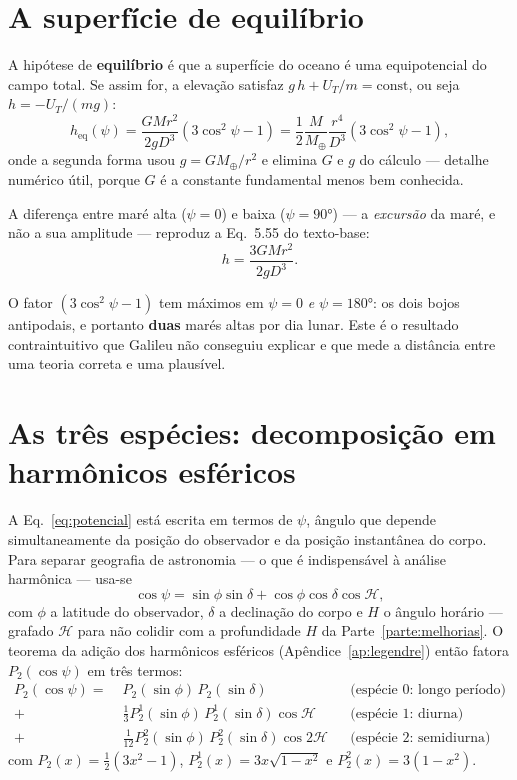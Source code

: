 \documentclass[11pt,a4paper,oneside]{report}
\theoremstyle{definition}
\theoremstyle{plain}
\theoremstyle{remark}
\begin{document}
\section{A superfície de equilíbrio}

A hipótese de \textbf{equilíbrio} é que a superfície do oceano é uma
equipotencial do campo total. Se assim for, a elevação satisfaz
$g\,h+U_T/m=\text{const}$, ou seja $h=-U_T/(mg)$:
\begin{equation}
h_{\text{eq}}(\psi)=\frac{GMr^{2}}{2gD^{3}}\left(3\cos^{2}\psi-1\right)
=\frac{1}{2}\frac{M}{M_\oplus}\frac{r^{4}}{D^{3}}\left(3\cos^{2}\psi-1\right),
\label{eq:heq}
\end{equation}
onde a segunda forma usou $g=GM_\oplus/r^{2}$ e elimina $G$ e $g$ do cálculo —
detalhe numérico útil, porque $G$ é a constante fundamental menos bem conhecida.

A diferença entre maré alta ($\psi=0$) e baixa ($\psi=\ang{90}$) — a
\emph{excursão} da maré, e não a sua amplitude — reproduz a Eq.~5.55 do
texto-base:
\begin{equation}
h=\frac{3GMr^{2}}{2gD^{3}} .
\tag{T\&M~5.55}
\label{eq:555}
\end{equation}

O fator $(3\cos^{2}\psi-1)$ tem máximos em $\psi=0$ \emph{e} $\psi=\ang{180}$:
os dois bojos antipodais, e portanto \textbf{duas} marés altas por dia lunar.
Este é o resultado contraintuitivo que Galileu não conseguiu explicar e que
mede a distância entre uma teoria correta e uma plausível.

\section{As três espécies: decomposição em harmônicos esféricos}
\label{sec:especies}

A Eq.~\eqref{eq:potencial} está escrita em termos de $\psi$, ângulo que depende
simultaneamente da posição do observador e da posição instantânea do corpo. Para
separar geografia de astronomia — o que é indispensável à análise harmônica —
usa-se
\begin{equation}
\cos\psi=\sin\phi\sin\delta+\cos\phi\cos\delta\cos\mathcal{H},
\end{equation}
com $\phi$ a latitude do observador, $\delta$ a declinação do corpo e $H$ o
ângulo horário — grafado $\mathcal{H}$ para não colidir com a profundidade
$H$ da Parte~\ref{parte:melhorias}. O teorema da adição dos harmônicos esféricos
(Apêndice~\ref{ap:legendre}) então fatora $P_2(\cos\psi)$ em três termos:
\begin{equation}
\boxed{
\begin{aligned}
P_2(\cos\psi)=\;&P_2(\sin\phi)\,P_2(\sin\delta) &&\text{(espécie 0: longo período)}\\
+\;&\tfrac13 P_2^{1}(\sin\phi)\,P_2^{1}(\sin\delta)\cos\mathcal{H} &&\text{(espécie 1: diurna)}\\
+\;&\tfrac1{12}P_2^{2}(\sin\phi)\,P_2^{2}(\sin\delta)\cos 2\mathcal{H} &&\text{(espécie 2: semidiurna)}
\end{aligned}}
\label{eq:especies}
\end{equation}
com $P_2(x)=\tfrac12(3x^{2}-1)$, $P_2^{1}(x)=3x\sqrt{1-x^{2}}$ e
$P_2^{2}(x)=3(1-x^{2})$.
\end{document}
